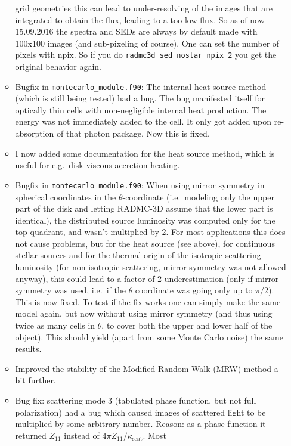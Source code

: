 \documentclass{report}
\begin{document}
\begin{itemize}
\begin{itemize}
    grid geometries this can lead to under-resolving of the images that are
    integrated to obtain the flux, leading to a too low flux.  So as of now
    15.09.2016 the spectra and SEDs are always by default made with 100x100
    images (and sub-pixeling of course). One can set the number of pixels
    with npix. So if you do {\small\tt radmc3d sed nostar npix 2} you get
    the original behavior again. 
  \item Bugfix in {\small\tt montecarlo\_module.f90}:
    The internal heat source method (which is still being tested)
    had a bug. The bug manifested itself for optically thin cells with
    non-negligible internal heat production. The energy was not immediately
    added to the cell. It only got added upon re-absorption of that photon
    package. Now this is fixed.
  \item I now added some documentation for the heat source method, which
    is useful for e.g.\ disk viscous accretion heating.
  \item Bugfix in {\small\tt montecarlo\_module.f90}: When using mirror
    symmetry in spherical coordinates in the $\theta$-coordinate
    (i.e.~modeling only the upper part of the disk and letting RADMC-3D
    assume that the lower part is identical), the distributed source
    luminosity was computed only for the top quadrant, and wasn't multiplied
    by 2. For most applications this does not cause problems, but for the
    heat source (see above), for continuous stellar sources and for the
    thermal origin of the isotropic scattering luminosity (for non-isotropic
    scattering, mirror symmetry was not allowed anyway), this could lead to
    a factor of 2 underestimation (only if mirror symmetry was used, i.e.\
    if the $\theta$ coordinate was going only up to $\pi/2$). This is now
    fixed. To test if the fix works one can simply make the same model
    again, but now without using mirror symmetry (and thus using twice as
    many cells in $\theta$, to cover both the upper and lower half of the
    object). This should yield (apart from some Monte Carlo noise) the same
    results.
  \item Improved the stability of the Modified Random Walk (MRW) method
    a bit further. 
  \item Bug fix: scattering mode 3 (tabulated phase function, but not full
    polarization) had a bug which caused images of scattered light to be
    multiplied by some arbitrary number. Reason: as a phase function it
    returned $Z_{11}$ instead of $4\pi Z_{11}/\kappa_{\mathrm{scat}}$. Most

\end{itemize}
\end{itemize}
\end{document}
